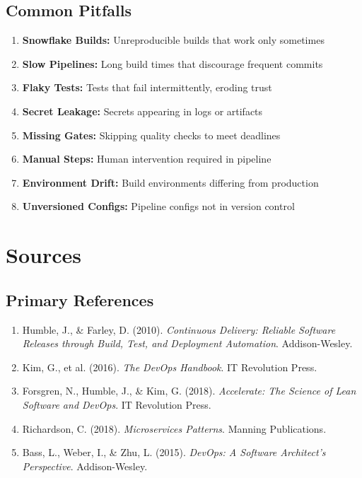 \documentclass[11pt,letterpaper]{article}
\begin{document}
\subsection{Common Pitfalls}

\begin{warningbox}
\begin{enumerate}[nosep]
    \item \textbf{Snowflake Builds:} Unreproducible builds that work only sometimes
    \item \textbf{Slow Pipelines:} Long build times that discourage frequent commits
    \item \textbf{Flaky Tests:} Tests that fail intermittently, eroding trust
    \item \textbf{Secret Leakage:} Secrets appearing in logs or artifacts
    \item \textbf{Missing Gates:} Skipping quality checks to meet deadlines
    \item \textbf{Manual Steps:} Human intervention required in pipeline
    \item \textbf{Environment Drift:} Build environments differing from production
    \item \textbf{Unversioned Configs:} Pipeline configs not in version control
\end{enumerate}
\end{warningbox}

\section{Sources}

\subsection{Primary References}

\begin{enumerate}
    \item Humble, J., \& Farley, D. (2010). \textit{Continuous Delivery: Reliable Software Releases through Build, Test, and Deployment Automation}. Addison-Wesley.
    
    \item Kim, G., et al. (2016). \textit{The DevOps Handbook}. IT Revolution Press.
    
    \item Forsgren, N., Humble, J., \& Kim, G. (2018). \textit{Accelerate: The Science of Lean Software and DevOps}. IT Revolution Press.
    
    \item Richardson, C. (2018). \textit{Microservices Patterns}. Manning Publications.
    
    \item Bass, L., Weber, I., \& Zhu, L. (2015). \textit{DevOps: A Software Architect's Perspective}. Addison-Wesley.
\end{enumerate}
\end{document}
